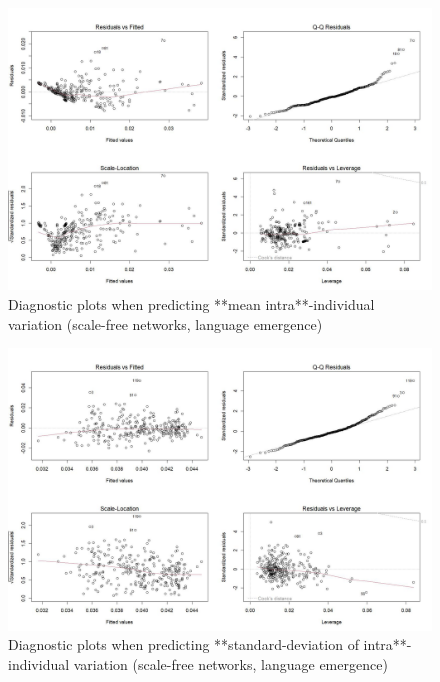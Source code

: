\documentclass[
]{article}
\begin{document}
\begin{figure}[!H]

{\centering \includegraphics{./Figures/unnamed-chunk-132-1} 

}

\caption{Diagnostic plots when predicting **mean intra**-individual variation (scale-free networks, language emergence)}\label{fig:unnamed-chunk-132}
\end{figure}

\begin{figure}[!H]

{\centering \includegraphics{./Figures/unnamed-chunk-133-1} 

}

\caption{Diagnostic plots when predicting **standard-deviation of intra**-individual variation (scale-free networks, language emergence)}\label{fig:unnamed-chunk-133}
\end{figure}
\end{document}
